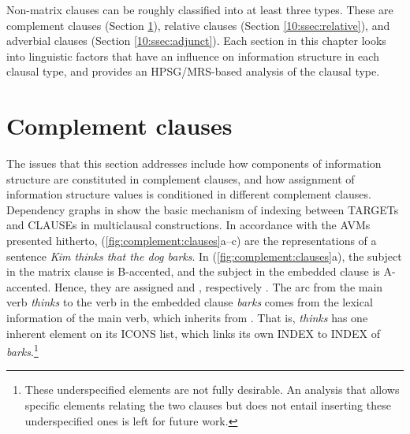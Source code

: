 Non-matrix clauses can be roughly classified into at least three
types.  These are complement clauses
(Section \ref{10:ssec:embedded}), relative clauses
(Section \ref{10:ssec:relative}), and adverbial clauses
(Section \ref{10:ssec:adjunct}). Each section in this
chapter looks into linguistic factors that have an influence on
information structure in each clausal type, and
provides an HPSG/MRS-based analysis of the clausal type.




\section{Complement clauses}
\label{10:ssec:embedded}


The issues that this section addresses include how components of
information structure are constituted in complement
clauses, and how assignment of information
structure values is conditioned in different complement clauses.
Dependency graphs in  show the basic
mechanism of indexing between TARGETs and CLAUSEs in multiclausal
constructions. In accordance with the AVMs
presented hitherto, (\ref{fig:complement:clauses}a--c) are the
representations of a sentence \textit{Kim thinks that the dog
  barks}. In (\ref{fig:complement:clauses}a), the subject in the
matrix clause is B-accented, and the subject in the embedded clause is
A-accented. Hence, they are assigned
 and ,
respectively . The arc from the main verb
\textit{thinks} to the verb in the embedded clause \textit{barks}
comes from the lexical information of the main verb, which inherits
from . That is, \textit{thinks} has one
inherent element on its ICONS list, which links its own INDEX to INDEX
of \textit{barks}.\footnote{These underspecified 
  elements are not fully desirable. An analysis
  that allows specific  elements relating the two clauses
  but does not entail inserting these underspecified ones is left for
  future work.}





